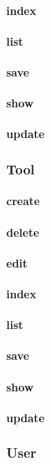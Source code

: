 \documentclass[12pt]{article}
\begin{document}
\paragraph{index}
\paragraph{list}
\paragraph{save}
\paragraph{show}
\paragraph{update}

\subsubsection{Tool}
\paragraph{create}
\paragraph{delete}
\paragraph{edit}
\paragraph{index}
\paragraph{list}
\paragraph{save}
\paragraph{show}
\paragraph{update}

\subsubsection{User}
\end{document}
